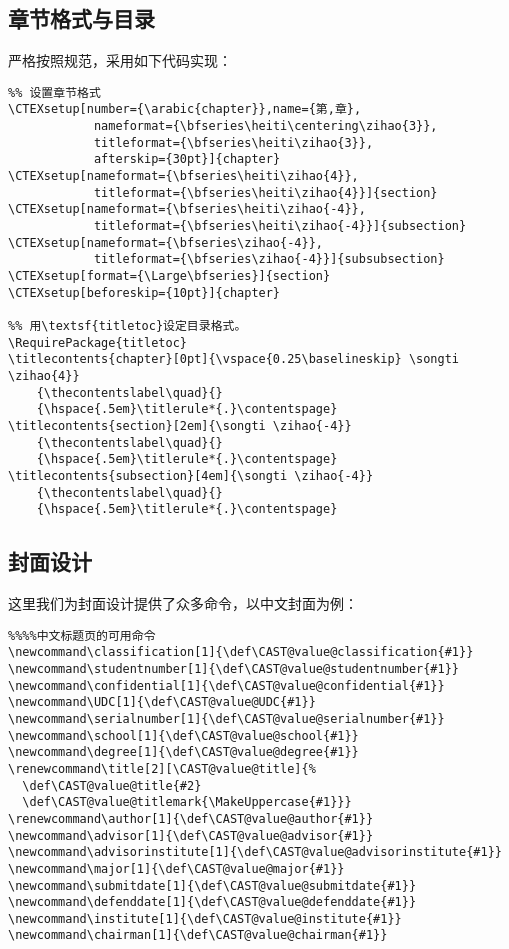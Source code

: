 \subsection{章节格式与目录}
严格按照规范，采用如下代码实现：
\begin{lstlisting}
%% 设置章节格式
\CTEXsetup[number={\arabic{chapter}},name={第,章},
            nameformat={\bfseries\heiti\centering\zihao{3}},
            titleformat={\bfseries\heiti\zihao{3}},
            afterskip={30pt}]{chapter}
\CTEXsetup[nameformat={\bfseries\heiti\zihao{4}},
            titleformat={\bfseries\heiti\zihao{4}}]{section}
\CTEXsetup[nameformat={\bfseries\heiti\zihao{-4}},
            titleformat={\bfseries\heiti\zihao{-4}}]{subsection}
\CTEXsetup[nameformat={\bfseries\zihao{-4}},
            titleformat={\bfseries\zihao{-4}}]{subsubsection}
\CTEXsetup[format={\Large\bfseries}]{section}
\CTEXsetup[beforeskip={10pt}]{chapter}

%% 用\textsf{titletoc}设定目录格式。
\RequirePackage{titletoc}
\titlecontents{chapter}[0pt]{\vspace{0.25\baselineskip} \songti \zihao{4}}
    {\thecontentslabel\quad}{}
    {\hspace{.5em}\titlerule*{.}\contentspage}
\titlecontents{section}[2em]{\songti \zihao{-4}}
    {\thecontentslabel\quad}{}
    {\hspace{.5em}\titlerule*{.}\contentspage}
\titlecontents{subsection}[4em]{\songti \zihao{-4}}
    {\thecontentslabel\quad}{}
    {\hspace{.5em}\titlerule*{.}\contentspage}
\end{lstlisting}

\subsection{封面设计}
这里我们为封面设计提供了众多命令，以中文封面为例：
\begin{lstlisting}
%%%%中文标题页的可用命令
\newcommand\classification[1]{\def\CAST@value@classification{#1}}
\newcommand\studentnumber[1]{\def\CAST@value@studentnumber{#1}}
\newcommand\confidential[1]{\def\CAST@value@confidential{#1}}
\newcommand\UDC[1]{\def\CAST@value@UDC{#1}}
\newcommand\serialnumber[1]{\def\CAST@value@serialnumber{#1}}
\newcommand\school[1]{\def\CAST@value@school{#1}}
\newcommand\degree[1]{\def\CAST@value@degree{#1}}
\renewcommand\title[2][\CAST@value@title]{%
  \def\CAST@value@title{#2}
  \def\CAST@value@titlemark{\MakeUppercase{#1}}}
\renewcommand\author[1]{\def\CAST@value@author{#1}}
\newcommand\advisor[1]{\def\CAST@value@advisor{#1}}
\newcommand\advisorinstitute[1]{\def\CAST@value@advisorinstitute{#1}}
\newcommand\major[1]{\def\CAST@value@major{#1}}
\newcommand\submitdate[1]{\def\CAST@value@submitdate{#1}}
\newcommand\defenddate[1]{\def\CAST@value@defenddate{#1}}
\newcommand\institute[1]{\def\CAST@value@institute{#1}}
\newcommand\chairman[1]{\def\CAST@value@chairman{#1}}
\end{lstlisting}

